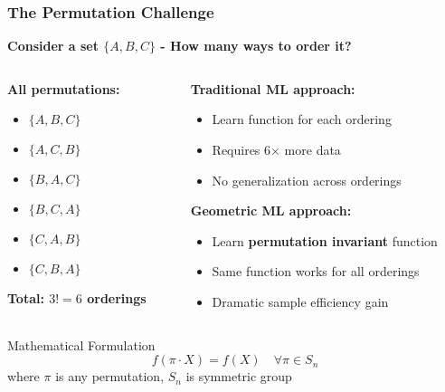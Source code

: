 \begin{frame}[fragile]\frametitle{The Permutation Challenge}

\begin{center}
\textbf{Consider a set $\{A, B, C\}$ - How many ways to order it?}
\end{center}

\begin{columns}
\begin{column}{0.5\textwidth}
\textbf{All permutations:}
\begin{itemize}
\item $\{A, B, C\}$
\item $\{A, C, B\}$  
\item $\{B, A, C\}$
\item $\{B, C, A\}$
\item $\{C, A, B\}$
\item $\{C, B, A\}$
\end{itemize}

\textbf{Total: $3! = 6$ orderings}
\end{column}
\begin{column}{0.5\textwidth}
\textbf{Traditional ML approach:}
\begin{itemize}
\item Learn function for each ordering
\item Requires 6× more data
\item No generalization across orderings
\end{itemize}

\vspace{0.5cm}
\textbf{Geometric ML approach:}
\begin{itemize}
\item Learn \textbf{permutation invariant} function
\item Same function works for all orderings
\item Dramatic sample efficiency gain
\end{itemize}
\end{column}
\end{columns}

\begin{block}{Mathematical Formulation}
$$f(\pi \cdot X) = f(X) \quad \forall \pi \in S_n$$
where $\pi$ is any permutation, $S_n$ is symmetric group
\end{block}

\end{frame}

